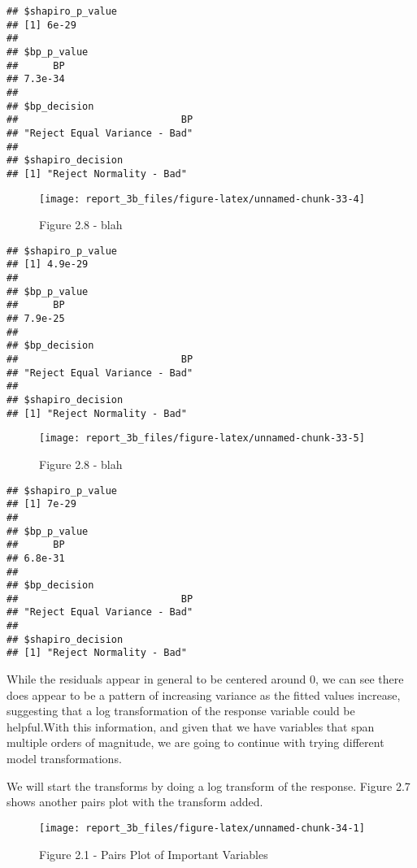 \documentclass[
]{article}
\begin{document}
\begin{verbatim}
## $shapiro_p_value
## [1] 6e-29
## 
## $bp_p_value
##      BP 
## 7.3e-34 
## 
## $bp_decision
##                            BP 
## "Reject Equal Variance - Bad" 
## 
## $shapiro_decision
## [1] "Reject Normality - Bad"
\end{verbatim}

\begin{figure}

{\centering \texttt{[image: report\_3b\_files/figure-latex/unnamed-chunk-33-4]} 

}

\caption{ Figure 2.8 - blah}\label{fig:unnamed-chunk-334}
\end{figure}

\begin{verbatim}
## $shapiro_p_value
## [1] 4.9e-29
## 
## $bp_p_value
##      BP 
## 7.9e-25 
## 
## $bp_decision
##                            BP 
## "Reject Equal Variance - Bad" 
## 
## $shapiro_decision
## [1] "Reject Normality - Bad"
\end{verbatim}

\begin{figure}

{\centering \texttt{[image: report\_3b\_files/figure-latex/unnamed-chunk-33-5]} 

}

\caption{ Figure 2.8 - blah}\label{fig:unnamed-chunk-335}
\end{figure}

\begin{verbatim}
## $shapiro_p_value
## [1] 7e-29
## 
## $bp_p_value
##      BP 
## 6.8e-31 
## 
## $bp_decision
##                            BP 
## "Reject Equal Variance - Bad" 
## 
## $shapiro_decision
## [1] "Reject Normality - Bad"
\end{verbatim}

While the residuals appear in general to be centered around 0, we can
see there does appear to be a pattern of increasing variance as the
fitted values increase, suggesting that a log transformation of the
response variable could be helpful.With this information, and given that
we have variables that span multiple orders of magnitude, we are going
to continue with trying different model transformations.

We will start the transforms by doing a log transform of the response.
Figure 2.7 shows another pairs plot with the transform added.

\begin{figure}

{\centering \texttt{[image: report\_3b\_files/figure-latex/unnamed-chunk-34-1]} 

}

\caption{Figure 2.1 - Pairs Plot of Important Variables}\label{fig:unnamed-chunk-34}
\end{figure}
\end{document}
